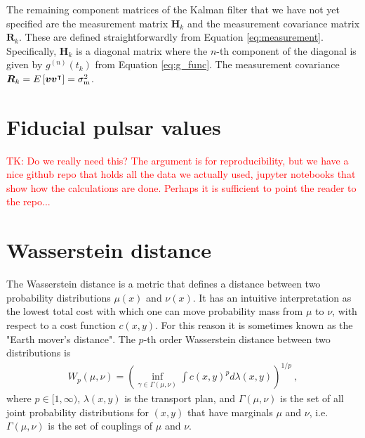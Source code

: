 \documentclass[fleqn,usenatbib,useAMS]{mnras}
\begin{document}
The remaining component matrices of the Kalman filter that we have not yet specified are the measurement matrix $\boldsymbol{H}_k$ and the measurement covariance matrix $\boldsymbol{R}_k$. These are defined straightforwardly from Equation \eqref{eq:measurement}. Specifically, 
$\boldsymbol{H}_k$ is a diagonal matrix where the $n$-th component of the diagonal is given by $g^{(n)}(t_k)$ from Equation \eqref{eq:g_func}. The measurement covariance $\boldsymbol{R}_k = E \left[ \boldsymbol{v} \boldsymbol{v}^\intercal \right] = \sigma^2_{\rm m}$.



\section{Fiducial pulsar values}\label{appendix_fiducial}
\textcolor{red}{TK: Do we really need this? The argument is for reproducibility, but we have a nice github repo that holds all the data we actually used, jupyter notebooks that show how the calculations are done. Perhaps it is sufficient to point the reader to the repo... } 

\section{Wasserstein distance}\label{sec:wasserstein}
The Wasserstein distance is a metric that defines a distance between two probability distributions $\mu(x)$ and $\nu(x)$. It has an intuitive interpretation as the lowest total cost with which one can move probability mass from $\mu$ to $\nu$, with respect to a cost function $c(x,y)$. For this reason it is sometimes known as the "Earth mover's distance". The $p$-th order Wasserstein distance between two distributions is
\begin{eqnarray}
	W_p(\mu,\nu)= \left( \inf_{\gamma \in \Gamma(\mu, \nu)}  \int c(x,y)^p d \lambda (x,y)\right)^{1/p} \label{eq:wasserstein} \ ,
\end{eqnarray}
where $p \in [1,\infty)$, $\lambda(x,y)$ is the transport plan, and $\Gamma(\mu, \nu)$ is the set of all joint probability distributions for $(x,y)$ that have marginals $\mu$ and $\nu$, i.e. $\Gamma(\mu, \nu)$ is the set of couplings of $\mu$ and $\nu$. 
\end{document}
